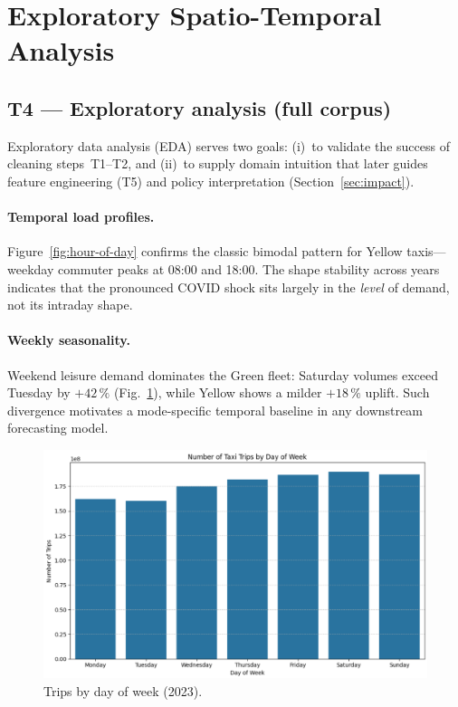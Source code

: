 \documentclass[conference]{IEEEtran}
\begin{document}
\section{Exploratory Spatio-Temporal Analysis}\label{sec:eda}
\subsection{T4 — Exploratory analysis (full corpus)}
\label{sec:t4-explore}

Exploratory data analysis (EDA) serves two goals:
(i)~to validate the success of cleaning steps~T1–T2, and
(ii)~to supply domain intuition that later guides feature engineering (T5) and
policy interpretation (Section~\ref{sec:impact}).

\paragraph*{Temporal load profiles.}
Figure~\ref{fig:hour-of-day} confirms the classic bimodal pattern for Yellow
taxis—weekday commuter peaks at 08:00 and 18:00. The
shape stability across years indicates that the pronounced COVID shock sits
largely in the \emph{level} of demand, not its intraday shape.

\paragraph*{Weekly seasonality.}
Weekend leisure demand dominates the Green fleet: Saturday volumes exceed
Tuesday by \(+42\,\%\) (Fig.~\ref{fig:dow}), while Yellow shows a milder
\( +18\,\% \) uplift.  Such divergence motivates a mode-specific temporal
baseline in any downstream forecasting model.

\begin{figure}[htbp]
  \centering
  \includegraphics[width=0.9\linewidth]{figures/dow_trips_yellow.png}
  \caption{Trips by day of week (2023).}
  \label{fig:dow}
\end{figure}
\end{document}
